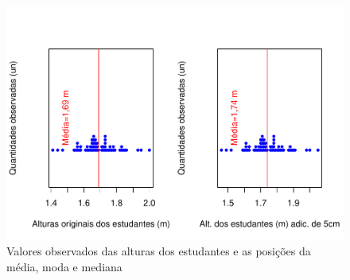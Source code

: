 \documentclass[
]{book}
\begin{document}
\begin{figure}

{\centering \includegraphics{apostila_files/figure-latex/unnamed-chunk-27-1} 

}

\caption{Valores observados das alturas dos estudantes e as posições da média, moda e mediana}\label{fig:unnamed-chunk-27}
\end{figure}

\hfill\break
\end{document}
